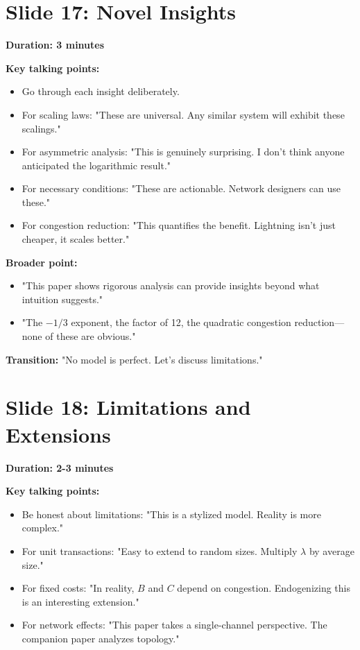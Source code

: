 \documentclass[11pt]{article}
\begin{document}

\section*{Slide 17: Novel Insights}

\textbf{Duration: 3 minutes}

\textbf{Key talking points:}
\begin{itemize}
    \item Go through each insight deliberately.
    \item For scaling laws: "These are universal. Any similar system will exhibit these scalings."
    \item For asymmetric analysis: "This is genuinely surprising. I don't think anyone anticipated the logarithmic result."
    \item For necessary conditions: "These are actionable. Network designers can use these."
    \item For congestion reduction: "This quantifies the benefit. Lightning isn't just cheaper, it scales better."
\end{itemize}

\textbf{Broader point:}
\begin{itemize}
    \item "This paper shows rigorous analysis can provide insights beyond what intuition suggests."
    \item "The $-1/3$ exponent, the factor of 12, the quadratic congestion reduction—none of these are obvious."
\end{itemize}

\textbf{Transition:} "No model is perfect. Let's discuss limitations."

\section*{Slide 18: Limitations and Extensions}

\textbf{Duration: 2-3 minutes}

\textbf{Key talking points:}
\begin{itemize}
    \item Be honest about limitations: "This is a stylized model. Reality is more complex."
    \item For unit transactions: "Easy to extend to random sizes. Multiply $\lambda$ by average size."
    \item For fixed costs: "In reality, $B$ and $C$ depend on congestion. Endogenizing this is an interesting extension."
    \item For network effects: "This paper takes a single-channel perspective. The companion paper analyzes topology."
\end{itemize}
\end{document}
